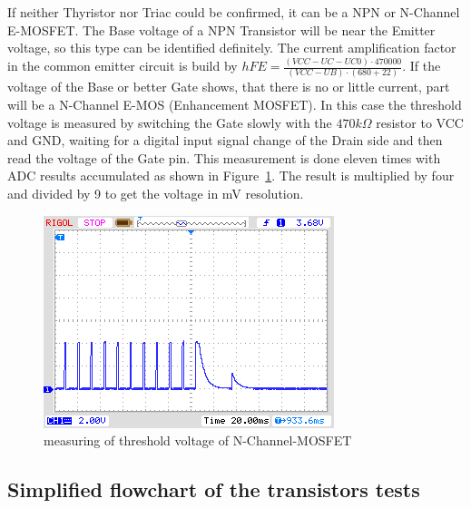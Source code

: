 If neither Thyristor nor Triac could be confirmed, it can be a NPN or N-Channel E-MOSFET.
The Base voltage of a NPN Transistor will be near the Emitter voltage, so this type can be
identified definitely.
The current amplification factor in the common emitter circuit is build by
\(hFE = \frac{(VCC-UC-UC0)\cdot 470000}{(VCC-UB)\cdot (680+22)}\).
If the voltage of the Base or better Gate  shows, that there is no or little current, part will be a N-Channel E-MOS 
(Enhancement MOSFET).
 In this case the threshold voltage is measured by switching the Gate slowly with
the \(470k\Omega\) resistor to VCC and GND, waiting for a digital input signal change of the Drain side and
then read the voltage of the Gate pin.
This measurement is done eleven times with ADC results accumulated as shown in Figure~\ref{fig:eleven}.
The result is multiplied by four and divided by 9 to get the voltage in mV resolution.
\begin{figure}[H]
\centering
\includegraphics[]{../PNG/IRFU120gate.png}
\caption{measuring of threshold voltage of N-Channel-MOSFET}
\label{fig:eleven}
\end{figure}

\subsection{Simplified flowchart of the transistors tests}

